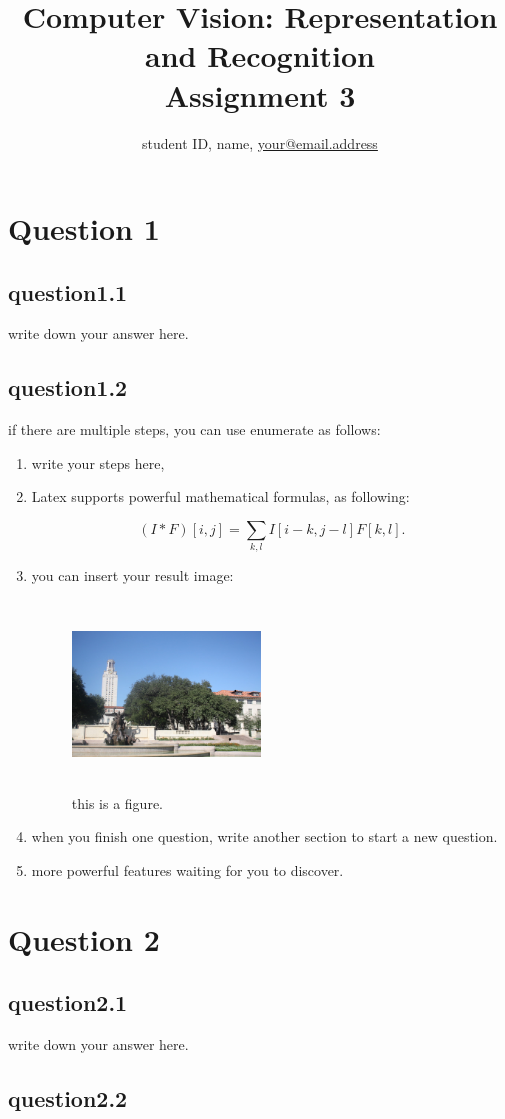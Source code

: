 \documentclass[a4paper,UTF8]{article}
\numberwithin{equation}{section}
\begin{document}
\title{Computer Vision: Representation and Recognition\\
Assignment 3}
\author{student ID, name, \href{mailto:your@email.address}{your@email.address}}
\maketitle

\section{Question 1}

\subsection{question1.1}
write down your answer here.

\subsection{question1.2}
if there are multiple steps, you can use enumerate as follows:

\begin{enumerate}[(\romannumeral1)]
	\item write your steps here,
	\item Latex supports powerful mathematical formulas, as following:

	\begin{equation}
		(I*F)[i,j]=\sum_{k,l}I[i-k,j-l]F[k,l].
	\end{equation}
	
	\item you can insert your result image:
	
	\begin{figure}[h]
		\centering  %
		\includegraphics[width=5cm,height=5cm]{uttower2.jpg}  %
		\caption{this is a figure.}  %
		\label{fig:mcmthesis-logo}   %
	\end{figure}
	\item when you finish one question, write another section to start a new question.
	\item more powerful features waiting for you to discover.
	
\end{enumerate} 

\section{Question 2}

\subsection{question2.1}
write down your answer here.

\subsection{question2.2}



\end{document}
